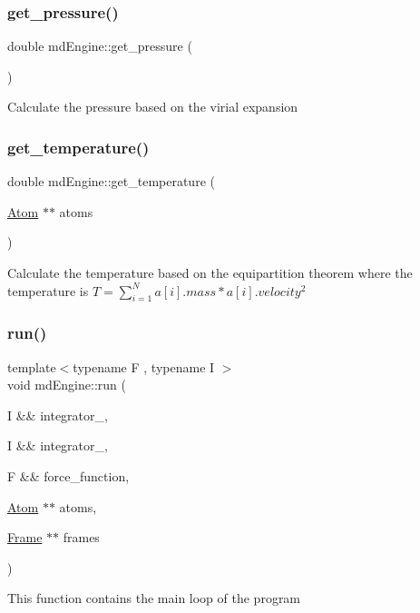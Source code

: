 \subsubsection{\texorpdfstring{get\+\_\+pressure()}{get\_pressure()}}
{\footnotesize\ttfamily double md\+Engine\+::get\+\_\+pressure (\begin{DoxyParamCaption}{ }\end{DoxyParamCaption})}

Calculate the pressure based on the virial expansion\mbox{\label{group___main__modules_ga5f8cc3610166e26157ab48c1905bd2b7}} 
\subsubsection{\texorpdfstring{get\+\_\+temperature()}{get\_temperature()}}
{\footnotesize\ttfamily double md\+Engine\+::get\+\_\+temperature (\begin{DoxyParamCaption}\item[{\mbox{\hyperlink{class_atom}{Atom}} $\ast$$\ast$}]{atoms }\end{DoxyParamCaption})}

Calculate the temperature based on the equipartition theorem where the temperature is $T = \sum^N_{i=1}a[i].mass * a[i].velocity^2$\mbox{\label{group___main__modules_ga9814b46948bb9bf9930a3a9392aa3a94}} 
\subsubsection{\texorpdfstring{run()}{run()}}
{\footnotesize\ttfamily template$<$typename F , typename I $>$ \\
void md\+Engine\+::run (\begin{DoxyParamCaption}\item[{I \&\&}]{integrator\+\_,  }\item[{I \&\&}]{integrator\+\_,  }\item[{F \&\&}]{force\+\_\+function,  }\item[{\mbox{\hyperlink{class_atom}{Atom}} $\ast$$\ast$}]{atoms,  }\item[{\mbox{\hyperlink{class_frame}{Frame}} $\ast$$\ast$}]{frames }\end{DoxyParamCaption})}

This function contains the main loop of the program